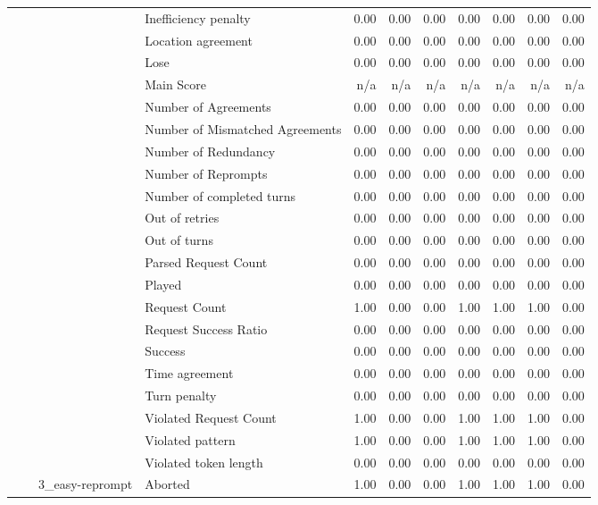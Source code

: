 \begin{tabular}{llllrrrrrrr}
 &  &  & Inefficiency penalty & 0.00 & 0.00 & 0.00 & 0.00 & 0.00 & 0.00 & 0.00 \\
 &  &  & Location agreement & 0.00 & 0.00 & 0.00 & 0.00 & 0.00 & 0.00 & 0.00 \\
 &  &  & Lose & 0.00 & 0.00 & 0.00 & 0.00 & 0.00 & 0.00 & 0.00 \\
 &  &  & Main Score & n/a & n/a & n/a & n/a & n/a & n/a & n/a \\
 &  &  & Number of Agreements & 0.00 & 0.00 & 0.00 & 0.00 & 0.00 & 0.00 & 0.00 \\
 &  &  & Number of Mismatched Agreements & 0.00 & 0.00 & 0.00 & 0.00 & 0.00 & 0.00 & 0.00 \\
 &  &  & Number of Redundancy & 0.00 & 0.00 & 0.00 & 0.00 & 0.00 & 0.00 & 0.00 \\
 &  &  & Number of Reprompts & 0.00 & 0.00 & 0.00 & 0.00 & 0.00 & 0.00 & 0.00 \\
 &  &  & Number of completed turns & 0.00 & 0.00 & 0.00 & 0.00 & 0.00 & 0.00 & 0.00 \\
 &  &  & Out of retries & 0.00 & 0.00 & 0.00 & 0.00 & 0.00 & 0.00 & 0.00 \\
 &  &  & Out of turns & 0.00 & 0.00 & 0.00 & 0.00 & 0.00 & 0.00 & 0.00 \\
 &  &  & Parsed Request Count & 0.00 & 0.00 & 0.00 & 0.00 & 0.00 & 0.00 & 0.00 \\
 &  &  & Played & 0.00 & 0.00 & 0.00 & 0.00 & 0.00 & 0.00 & 0.00 \\
 &  &  & Request Count & 1.00 & 0.00 & 0.00 & 1.00 & 1.00 & 1.00 & 0.00 \\
 &  &  & Request Success Ratio & 0.00 & 0.00 & 0.00 & 0.00 & 0.00 & 0.00 & 0.00 \\
 &  &  & Success & 0.00 & 0.00 & 0.00 & 0.00 & 0.00 & 0.00 & 0.00 \\
 &  &  & Time agreement & 0.00 & 0.00 & 0.00 & 0.00 & 0.00 & 0.00 & 0.00 \\
 &  &  & Turn penalty & 0.00 & 0.00 & 0.00 & 0.00 & 0.00 & 0.00 & 0.00 \\
 &  &  & Violated Request Count & 1.00 & 0.00 & 0.00 & 1.00 & 1.00 & 1.00 & 0.00 \\
 &  &  & Violated pattern & 1.00 & 0.00 & 0.00 & 1.00 & 1.00 & 1.00 & 0.00 \\
 &  &  & Violated token length & 0.00 & 0.00 & 0.00 & 0.00 & 0.00 & 0.00 & 0.00 \\
\cline{3-11}
 &  & \multirow[t]{27}{*}{3_easy-reprompt} & Aborted & 1.00 & 0.00 & 0.00 & 1.00 & 1.00 & 1.00 & 0.00 \\

\end{tabular}
